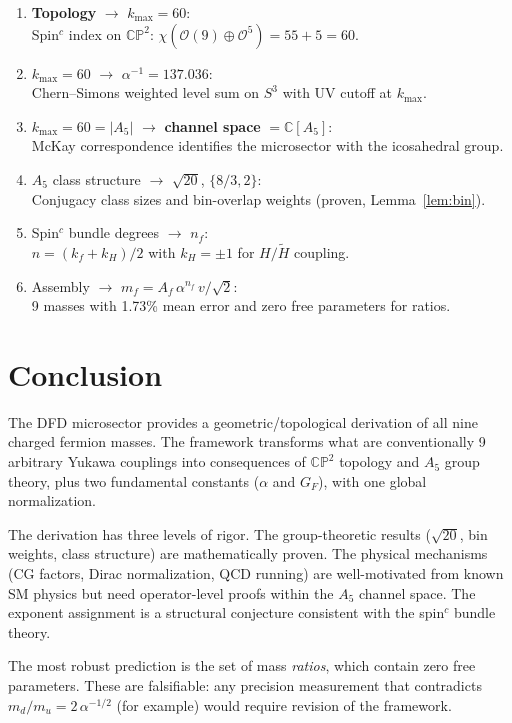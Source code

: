 \documentclass[11pt,a4paper]{article}
\newcommand{\CP}{\mathbb{CP}}
\theoremstyle{definition}
\theoremstyle{remark}
\begin{document}
\begin{enumerate}
\item \textbf{Topology} $\to$ $k_{\max} = 60$: \\
  Spin$^c$ index on $\CP^2$: $\chi(\mathcal{O}(9) \oplus \mathcal{O}^5) = 55+5 = 60$.

\item $k_{\max} = 60$ $\to$ $\alpha^{-1} = 137.036$: \\
  Chern--Simons weighted level sum on $S^3$ with UV cutoff at $k_{\max}$.

\item $k_{\max} = 60 = |A_5|$ $\to$ \textbf{channel space} $= \mathbb{C}[A_5]$: \\
  McKay correspondence identifies the microsector with the icosahedral group.

\item $A_5$ class structure $\to$ $\sqrt{20}$, $\{8/3, 2\}$: \\
  Conjugacy class sizes and bin-overlap weights (proven, Lemma~\ref{lem:bin}).

\item Spin$^c$ bundle degrees $\to$ $n_f$: \\
  $n = (k_f + k_H)/2$ with $k_H = \pm 1$ for $H/\tilde{H}$ coupling.

\item Assembly $\to$ $m_f = A_f\,\alpha^{n_f}\,v/\sqrt{2}$: \\
  9 masses with 1.73\% mean error and zero free parameters for ratios.
\end{enumerate}

\section{Conclusion}
\label{sec:conclusion}

The DFD microsector provides a geometric/topological derivation of all nine
charged fermion masses.  The framework transforms what are conventionally 9
arbitrary Yukawa couplings into consequences of $\CP^2$ topology and $A_5$
group theory, plus two fundamental constants ($\alpha$ and $G_F$), with one
global normalization.

The derivation has three levels of rigor.  The group-theoretic results
($\sqrt{20}$, bin weights, class structure) are mathematically proven.
The physical mechanisms (CG factors, Dirac normalization, QCD running) are
well-motivated from known SM physics but need operator-level proofs within
the $A_5$ channel space.  The exponent assignment is a structural conjecture
consistent with the spin$^c$ bundle theory.

The most robust prediction is the set of mass \emph{ratios}, which contain
zero free parameters.  These are falsifiable: any precision measurement that
contradicts $m_d/m_u = 2\,\alpha^{-1/2}$ (for example) would require
revision of the framework.
\end{document}
